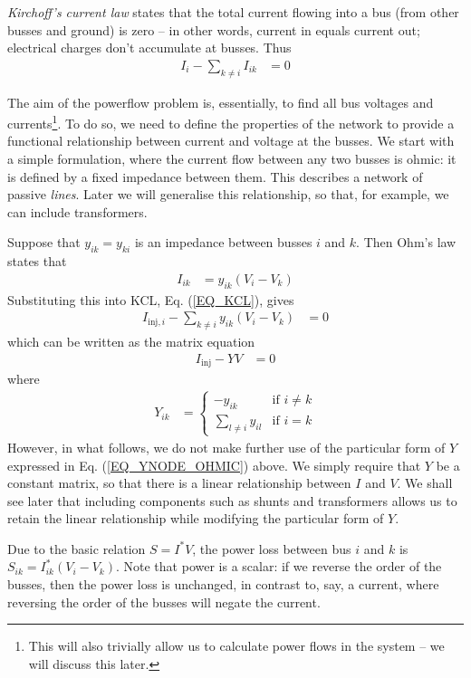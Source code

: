 \documentclass[11pt]{article}
\begin{document}
\emph{Kirchoff's current law} states that the total current flowing into a bus (from other busses and ground) is zero -- in other words, current in equals current out; electrical charges don't accumulate at busses. Thus
\begin{align}
	I_{i} - \sum_{k \ne i}{I_{ik}} &= 0
	\label{EQ_KCL}
\end{align}

The aim of the powerflow problem is, essentially, to find all bus voltages and currents\footnote{This will also trivially allow us to calculate power flows in the system -- we will discuss this later.}. To do so, we need to define the properties of the network to provide a functional relationship between current and voltage at the busses. We start with a simple formulation, where the current flow between any two busses is ohmic: it is defined by a fixed impedance between them. This describes a network of passive \emph{lines}. Later we will generalise this relationship, so that, for example, we can include transformers.

Suppose that $y_{ik} = y_{ki}$ is an impedance between busses $i$ and $k$. Then Ohm's law states that
\begin{align}
	I_{ik} &= y_{ik}(V_i - V_k)
\end{align}
Substituting this into KCL, Eq. (\ref{EQ_KCL}), gives
\begin{align}
	I_{\text{inj},i} - \sum_{k \ne i}{y_{ik}(V_i - V_k)} &= 0
	\label{EQ_PF_1}
\end{align}
which can be written as the matrix equation
\begin{align}
	I_\text{inj} - YV &= 0
\end{align}
where
\begin{align}
	Y_{ik} &=
		\begin{cases}
			-y_{ik}&\text{if $i \ne k$} \\
			\sum_{l \ne i} y_{il}& \text{if $i = k$}
		\end{cases}
	\label{EQ_YNODE_OHMIC}
\end{align}
However, in what follows, we do not make further use of the particular form of $Y$ expressed in Eq. (\ref{EQ_YNODE_OHMIC}) above. We simply require that $Y$ be a constant matrix, so that there is a linear relationship between $I$ and $V$. We shall see later that including components such as shunts and transformers allows us to retain the linear relationship while modifying the particular form of $Y$.

Due to the basic relation $S = I^*V$, the power loss between bus $i$ and $k$ is $S_{ik} = I_{ik}^*(V_i - V_k)$. Note that power is a scalar: if we reverse the order of the busses, then the power loss is unchanged, in contrast to, say, a current, where reversing the order of the busses will negate the current.
\end{document}
